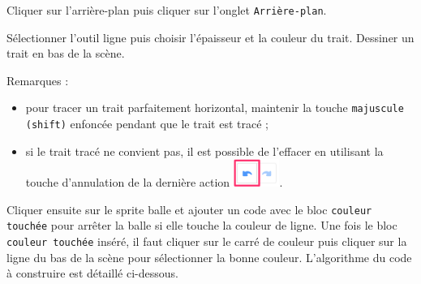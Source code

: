 Cliquer sur l'arrière-plan puis cliquer sur l'onglet \texttt{Arrière-plan}.


Sélectionner l'outil ligne  puis choisir l'épaisseur  et la couleur  du trait. Dessiner un trait  en bas de la scène. 

\vspace{12pt}

Remarques :
\begin{itemize}
\item pour tracer un trait parfaitement horizontal, maintenir la touche \texttt{majuscule (shift)} enfoncée pendant que le trait est tracé ;
\item si le trait tracé ne convient pas, il est possible de l'effacer en utilisant la touche d'annulation de la dernière action \includegraphics[width=1.5cm]{./images/scratch02/wallPong12.png}.
\end{itemize}


\vspace{12pt}

Cliquer ensuite sur le sprite balle et ajouter un code avec le bloc \texttt{couleur touchée} pour arrêter la balle si elle touche la couleur de ligne. Une fois le bloc \texttt{couleur touchée} inséré, il faut cliquer sur le carré de couleur puis cliquer sur la ligne du bas de la scène pour sélectionner la bonne couleur. L'algorithme du code à construire est détaillé ci-dessous.







